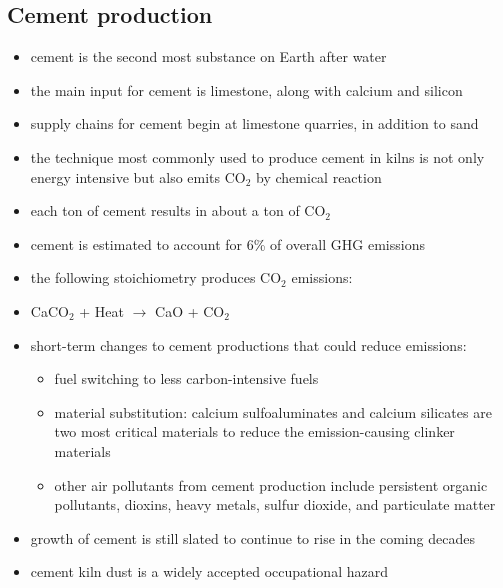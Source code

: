 \subsection{Cement production}
\begin{itemize}
	\item cement is the second most substance on Earth after water
	\item the main input for cement is limestone, along with calcium and
	silicon
	\item supply chains for cement begin at limestone quarries, in
	addition to sand
	\item the technique most commonly used to produce cement in kilns is
	not only energy intensive but also emits CO$_2$ by chemical reaction
	\item each ton of cement results in about a ton of CO$_2$
	\item cement is estimated to account for 6\% of overall GHG emissions
	\item the following stoichiometry produces CO$_2$ emissions:
	\item CaCO$_2$ + Heat $\rightarrow$ CaO + CO$_2$
	\item short-term changes to cement productions that could reduce
	emissions:
	\begin{itemize}
		\item fuel switching to less carbon-intensive fuels
		\item material substitution: calcium sulfoaluminates and
		calcium silicates are two most critical materials to reduce the
		emission-causing clinker materials
		\item other air pollutants from cement production include
		persistent organic pollutants, dioxins, heavy metals, sulfur
		dioxide, and particulate matter
	\end{itemize}
	\item growth of cement is still slated to continue to rise in the
	coming decades
	\item cement kiln dust is a widely accepted occupational hazard
\end{itemize}


